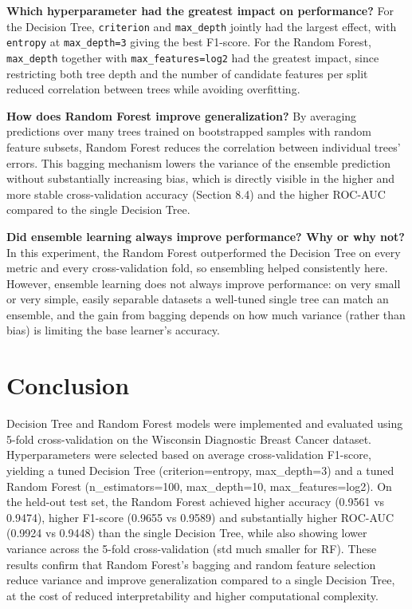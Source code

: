 \documentclass[12pt,a4paper]{article}
\begin{document}
\textbf{Which hyperparameter had the greatest impact on performance?} For the Decision Tree,
\texttt{criterion} and \texttt{max\_depth} jointly had the largest effect, with
\texttt{entropy} at \texttt{max\_depth=3} giving the best F1-score. For the Random Forest,
\texttt{max\_depth} together with \texttt{max\_features=log2} had the greatest impact,
since restricting both tree depth and the number of candidate features per split reduced
correlation between trees while avoiding overfitting.

\textbf{How does Random Forest improve generalization?} By averaging predictions over many
trees trained on bootstrapped samples with random feature subsets, Random Forest reduces the
correlation between individual trees' errors. This bagging mechanism lowers the variance of
the ensemble prediction without substantially increasing bias, which is directly visible in
the higher and more stable cross-validation accuracy (Section 8.4) and the higher ROC-AUC
compared to the single Decision Tree.

\textbf{Did ensemble learning always improve performance? Why or why not?} In this
experiment, the Random Forest outperformed the Decision Tree on every metric and every
cross-validation fold, so ensembling helped consistently here. However, ensemble learning
does not always improve performance: on very small or very simple, easily separable
datasets a well-tuned single tree can match an ensemble, and the gain from bagging depends
on how much variance (rather than bias) is limiting the base learner's accuracy.

\section{Conclusion}
Decision Tree and Random Forest models were implemented and evaluated using 5-fold
cross-validation on the Wisconsin Diagnostic Breast Cancer dataset. Hyperparameters were
selected based on average cross-validation F1-score, yielding a tuned Decision Tree
(criterion=entropy, max\_depth=3) and a tuned Random Forest (n\_estimators=100,
max\_depth=10, max\_features=log2). On the held-out test set, the Random Forest achieved
higher accuracy (0.9561 vs 0.9474), higher F1-score (0.9655 vs 0.9589) and substantially
higher ROC-AUC (0.9924 vs 0.9448) than the single Decision Tree, while also showing lower
variance across the 5-fold cross-validation (std much smaller for RF). These results confirm
that Random Forest's bagging and random feature selection reduce variance and improve
generalization compared to a single Decision Tree, at the cost of reduced interpretability
and higher computational complexity.
\end{document}
